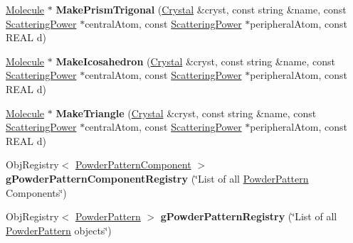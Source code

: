 \begin{DoxyCompactItemize}
\item 
\mbox{\label{namespace_obj_cryst_ad8924f96d4fccea6371f4e225cbe6504}} 
\mbox{\hyperlink{class_obj_cryst_1_1_molecule}{Molecule}} $\ast$ {\bfseries Make\+Prism\+Trigonal} (\mbox{\hyperlink{class_obj_cryst_1_1_crystal}{Crystal}} \&cryst, const string \&name, const \mbox{\hyperlink{class_obj_cryst_1_1_scattering_power}{Scattering\+Power}} $\ast$central\+Atom, const \mbox{\hyperlink{class_obj_cryst_1_1_scattering_power}{Scattering\+Power}} $\ast$peripheral\+Atom, const R\+E\+AL d)
\item 
\mbox{\label{namespace_obj_cryst_a659918245a784c9a090312dfa7865c96}} 
\mbox{\hyperlink{class_obj_cryst_1_1_molecule}{Molecule}} $\ast$ {\bfseries Make\+Icosahedron} (\mbox{\hyperlink{class_obj_cryst_1_1_crystal}{Crystal}} \&cryst, const string \&name, const \mbox{\hyperlink{class_obj_cryst_1_1_scattering_power}{Scattering\+Power}} $\ast$central\+Atom, const \mbox{\hyperlink{class_obj_cryst_1_1_scattering_power}{Scattering\+Power}} $\ast$peripheral\+Atom, const R\+E\+AL d)
\item 
\mbox{\label{namespace_obj_cryst_a82b12d7e2cc11c0087336a720c48b1cc}} 
\mbox{\hyperlink{class_obj_cryst_1_1_molecule}{Molecule}} $\ast$ {\bfseries Make\+Triangle} (\mbox{\hyperlink{class_obj_cryst_1_1_crystal}{Crystal}} \&cryst, const string \&name, const \mbox{\hyperlink{class_obj_cryst_1_1_scattering_power}{Scattering\+Power}} $\ast$central\+Atom, const \mbox{\hyperlink{class_obj_cryst_1_1_scattering_power}{Scattering\+Power}} $\ast$peripheral\+Atom, const R\+E\+AL d)
\item 
\mbox{\label{namespace_obj_cryst_a249f819a83183043b8cf181e71d4c5b1}} 
Obj\+Registry$<$ \mbox{\hyperlink{class_obj_cryst_1_1_powder_pattern_component}{Powder\+Pattern\+Component}} $>$ {\bfseries g\+Powder\+Pattern\+Component\+Registry} (\char`\"{}List of all \mbox{\hyperlink{class_obj_cryst_1_1_powder_pattern}{Powder\+Pattern}} Components\char`\"{})
\item 
\mbox{\label{namespace_obj_cryst_ad0ab9bbee37c5133d1bf58182df267db}} 
Obj\+Registry$<$ \mbox{\hyperlink{class_obj_cryst_1_1_powder_pattern}{Powder\+Pattern}} $>$ {\bfseries g\+Powder\+Pattern\+Registry} (\char`\"{}List of all \mbox{\hyperlink{class_obj_cryst_1_1_powder_pattern}{Powder\+Pattern}} objects\char`\"{})

\end{DoxyCompactItemize}
